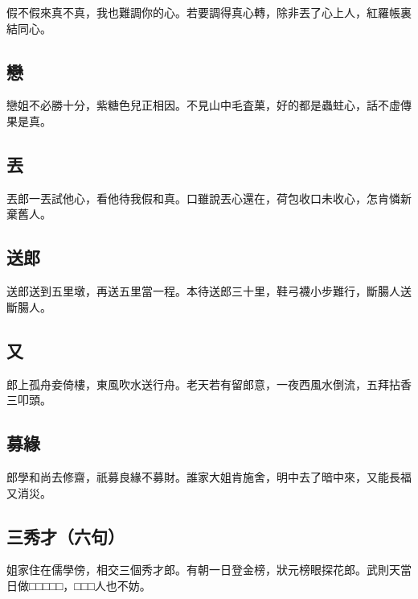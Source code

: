 假不假來真不真，我也難調你的心。若要調得真心轉，除非丟了心上人，紅羅帳裏結同心。

\subsection*{戀}

戀姐不必勝十分，紫糖色兒正相因。不見山中毛査菓，好的都是蟲蛀心，話不虛傳果是真。

\subsection*{丟}

丟郎一丟試他心，看他待我假和真。口雖說丟心還在，荷包收口未收心，怎肯憐新棄舊人。

\subsection*{送郎}

送郎送到五里墩，再送五里當一程。本待送郎三十里，鞋弓襪小步難行，斷腸人送斷腸人。

\subsection*{又}

郎上孤舟妾倚樓，東風吹水送行舟。老天若有留郎意，一夜西風水倒流，五拜拈香三叩頭。

\subsection*{募緣}

郎學和尚去修齋，祇募良緣不募財。誰家大姐肯施舍，明中去了暗中來，又能長福又消災。

\subsection*{三秀才（六句）}

姐家住在儒學傍，相交三個秀才郎。有朝一日登金榜，狀元榜眼探花郎。武則天當日做□□□□□，□□□人也不妨。
